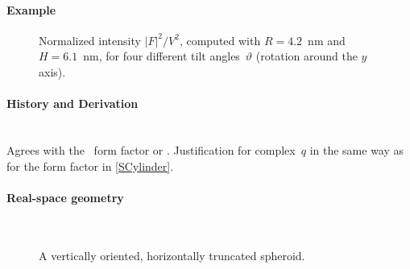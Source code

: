 \paragraph{Example}\strut

\begin{figure}[H]
\begin{center}
\end{center}
\caption{Normalized intensity $|F|^2/V^2$,
computed with $R=4.2$~nm and $H=6.1$~nm,
for four different tilt angles~$\vartheta$ (rotation around the $y$ axis).}
\end{figure}

\paragraph{History and Derivation}\strut\\
Agrees with the \IsGISAXS\ form factor
 \cite[Eq.~2.33]{Laz06} or
 \cite[Eq.~228]{ReLL09}.
Justification for complex~$q$ in the same way as for the  form factor
in \cref{SCylinder}.


 \label{STruncatedSpheroid}

\paragraph{Real-space geometry}\strut\\

\begin{figure}[H]
\hfill
{}
\hfill
{}
\hfill
{}
\hfill
\caption{A vertically oriented, horizontally truncated spheroid.}
\end{figure}


